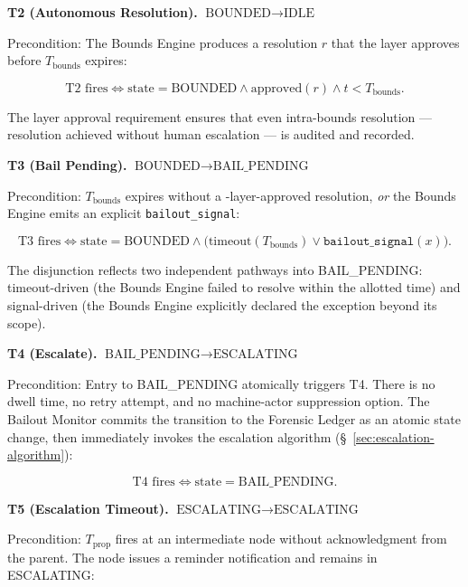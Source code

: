 \bigskip
\noindent\textbf{T2 (Autonomous Resolution).} $\text{BOUNDED} \rightarrow \text{IDLE}$

Precondition: The Bounds Engine produces a resolution $r$ that the \fact{} layer approves before $T_{\text{bounds}}$ expires:

\begin{equation}
\text{T2 fires} \iff \text{state} = \text{BOUNDED} \land \text{approved}(r) \land t < T_{\text{bounds}}. \tag{T2}
\end{equation}

The \fact{} layer approval requirement ensures that even intra-bounds resolution — resolution achieved without human escalation — is audited and recorded.

\bigskip
\noindent\textbf{T3 (Bail Pending).} $\text{BOUNDED} \rightarrow \text{BAIL\_PENDING}$

Precondition: $T_{\text{bounds}}$ expires without a \fact-layer-approved resolution, \emph{or} the Bounds Engine emits an explicit \texttt{bailout\_signal}:

\begin{equation}
\text{T3 fires} \iff \text{state} = \text{BOUNDED} \land \bigl(\text{timeout}(T_{\text{bounds}}) \lor \texttt{bailout\_signal}(x)\bigr). \tag{T3}
\end{equation}

The disjunction reflects two independent pathways into BAIL\_PENDING: timeout-driven (the Bounds Engine failed to resolve within the allotted time) and signal-driven (the Bounds Engine explicitly declared the exception beyond its scope).

\bigskip
\noindent\textbf{T4 (Escalate).} $\text{BAIL\_PENDING} \rightarrow \text{ESCALATING}$

Precondition: Entry to BAIL\_PENDING atomically triggers T4. There is no dwell time, no retry attempt, and no machine-actor suppression option. The Bailout Monitor commits the transition to the Forensic Ledger as an atomic state change, then immediately invokes the escalation algorithm (\S~\ref{sec:escalation-algorithm}):

\begin{equation}
\text{T4 fires} \iff \text{state} = \text{BAIL\_PENDING}. \tag{T4}
\end{equation}

\bigskip
\noindent\textbf{T5 (Escalation Timeout).} $\text{ESCALATING} \rightarrow \text{ESCALATING}$

Precondition: $T_{\text{prop}}$ fires at an intermediate node without acknowledgment from the parent. The node issues a reminder notification and remains in ESCALATING:

